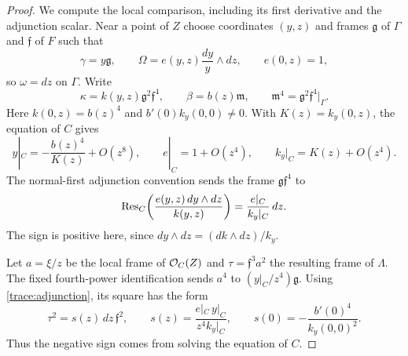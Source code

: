 \begin{proof}
We compute the local comparison, including its first derivative and the
adjunction scalar.  Near a point of $Z$ choose coordinates $(y,z)$ and
frames $\mathfrak g$ of $\Gamma$ and $\mathfrak f$ of $F$ such that
\[
 \gamma=y\mathfrak g,\qquad
 \Omega=e(y,z)\frac{dy}{y}\wedge dz,\qquad e(0,z)=1,
\]
so $\omega=dz$ on $\Gamma$.  Write
\[
 \kappa=k(y,z)\mathfrak g^2\mathfrak f^4,
 \qquad \beta=b(z)\mathfrak m,
 \qquad \mathfrak m^4=\mathfrak g^2\mathfrak f^4\big|_\Gamma.
\]
Here $k(0,z)=b(z)^4$ and
$b'(0)k_y(0,0)\ne0$.  With $K(z)=k_y(0,z)$, the equation of $C$ gives
\begin{equation}\label{trace:contact-expansion}
 y|_C=-\frac{b(z)^4}{K(z)}+O(z^8),\qquad
 e|_C=1+O(z^4),\qquad k_y|_C=K(z)+O(z^4).
\end{equation}
The normal-first adjunction convention sends the frame
$\mathfrak g\mathfrak f^4$ to
\begin{equation}\label{trace:adjunction}
 \operatorname{Res}_C\!\left(\frac{e(y,z)\,dy\wedge dz}{k(y,z)}\right)
       =\frac{e|_C}{k_y|_C}\,dz.
\end{equation}
The sign is positive here, since
$dy\wedge dz=(dk\wedge dz)/k_y$.

Let $a=\xi/z$ be the local frame of $\mathcal O_C(Z)$ and
$\tau=\mathfrak f^3a^2$ the resulting frame of $\Lambda$.
The fixed fourth-power identification sends
$a^4$ to $(y|_C/z^4)\mathfrak g$.
Using \eqref{trace:adjunction}, its square has the form
\begin{equation}\label{trace:frame-square}
 \tau^2=s(z)\,dz\,\mathfrak f^2,
 \qquad
 s(z)=\frac{e|_C\,y|_C}{z^4 k_y|_C},\qquad
 s(0)=-\frac{b'(0)^4}{k_y(0,0)^2}.
\end{equation}
Thus the negative sign comes from solving the equation of $C$.


\end{proof}
